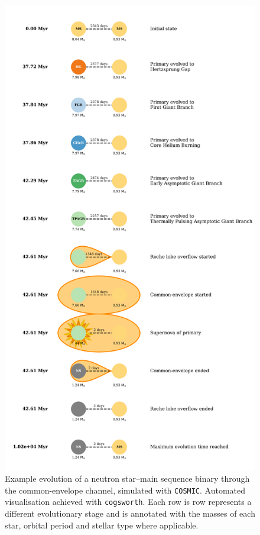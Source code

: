 \documentclass[twocolumn, twocolappendix]{aastex631}
\newcommand{\cosmic}{\texttt{COSMIC}\xspace}
\newcommand{\cogsworth}{\texttt{cogsworth}\xspace}
\begin{document}
\begin{figure}
    \centering
    \includegraphics[width=\columnwidth]{figures/cartoon.png}
    \caption{Example evolution of a neutron star--main sequence binary through the common-envelope channel, simulated with \cosmic. Automated visualisation achieved with \cogsworth. Each row is row represents a different evolutionary stage and is annotated with the masses of each star, orbital period and stellar type where applicable.}
    \label{fig:cartoon_ms_ns}
\end{figure}
\end{document}
